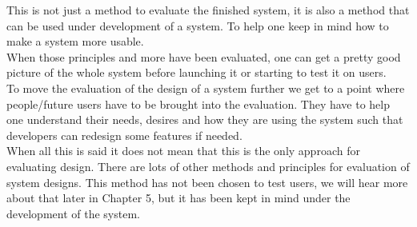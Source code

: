This is not just a method to evaluate the finished system, it is also a method that can be used under development of a system. To help one keep in mind how to make a system more usable.\\

When those principles and more have been evaluated, one can get a pretty good picture of the whole system before launching it or starting to test it on users.\\

To move the evaluation of the design of a system further we get to a point where people/future users have to be brought into the evaluation. They have to help one understand their needs, desires and how they are using the system such that developers can redesign some features if needed.\\

When all this is said it does not mean that this is the only approach for evaluating design. There are lots of other methods and principles for evaluation of system designs. This method has not been chosen to test users, we will hear more about that later in Chapter 5, but it has been kept in mind under the development of the system.\cite{Benyon10} 


